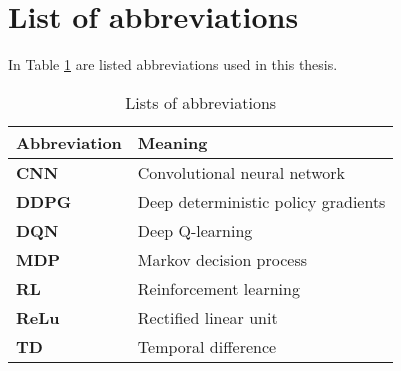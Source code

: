\section{List of abbreviations}\label{ape:abbreviations}

In Table \ref{table:abbreviations} are listed abbreviations used in this thesis.

\begin{table}[!htb]
\centering
\begin{tabular}{ll}
\textbf{Abbreviation} & \textbf{Meaning} \\
\hline
\textbf{CNN} & Convolutional neural network \\
\hline
\textbf{DDPG} & Deep deterministic policy gradients \\
\hline
\textbf{DQN} & Deep Q-learning \\
\hline
\textbf{MDP} & Markov decision process \\
\hline
\textbf{RL} & Reinforcement learning \\
\hline
\textbf{ReLu} & Rectified linear unit \\
\hline
\textbf{TD} & Temporal difference \\
\hline
\end{tabular}
\caption{Lists of abbreviations}
\label{table:abbreviations}
\end{table}